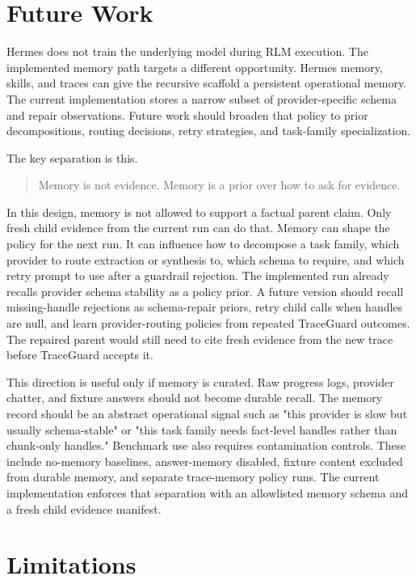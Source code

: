 \documentclass[11pt,a4paper]{article}
\begin{document}
\section{Future Work}
\label{sec:future-memory}

Hermes does not train the underlying model during RLM execution. The
implemented memory path targets a different opportunity. Hermes memory,
skills, and traces can give the recursive scaffold a persistent operational
memory. The current implementation stores a narrow subset of provider-specific
schema and repair observations. Future work should broaden that policy to
prior decompositions, routing decisions, retry strategies, and task-family
specialization.

The key separation is this.

\begin{quote}
Memory is not evidence. Memory is a prior over how to ask for evidence.
\end{quote}

In this design, memory is not allowed to support a factual parent claim. Only
fresh child evidence from the current run can do that. Memory can shape the
policy for the next run. It can influence how to decompose a task family,
which provider to route extraction or synthesis to, which schema to require,
and which retry prompt to use after a guardrail rejection. The implemented
run already recalls provider schema stability as a policy prior. A future
version should recall missing-handle rejections as schema-repair priors,
retry child calls when handles are null, and learn provider-routing policies
from repeated TraceGuard outcomes. The repaired parent would still need to
cite fresh evidence from the new trace before TraceGuard accepts it.

This direction is useful only if memory is curated. Raw progress logs,
provider chatter, and fixture answers should not become durable recall. The
memory record should be an abstract operational signal such as "this provider
is slow but usually schema-stable" or "this task family needs fact-level
handles rather than chunk-only handles." Benchmark use also requires
contamination controls. These include no-memory baselines, answer-memory
disabled, fixture content excluded from durable memory, and separate
trace-memory policy runs. The current implementation enforces that separation
with an allowlisted memory schema and a fresh child evidence manifest.

\section{Limitations}
\label{sec:limits}
\end{document}
